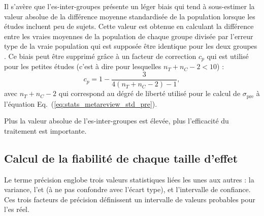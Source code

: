 Il s'avère que l'\gls{es}-inter-groupes présente un léger biais qui tend à sous-estimer la valeur absolue de la différence moyenne standardisée de la population
lorsque les études incluent peu de sujets. Cette valeur est obtenue en calculant la différence entre les vraies moyennes de la population de chaque groupe divisée 
par l'erreur type de la vraie population qui est supposée être identique pour les deux groupes \citep[Chapitre~4]{Borenstein2009}. Ce biais peut être supprimé 
grâce à un facteur de correction $c_p$ qui est utilisé pour les petites études (c'est à dire pour lesquelles $n_T + n_C - 2 < 10$) : 
\begin{equation}
\label{eq:metareview_correction_factor}
c_p =  1 - \frac{3} {4(n_T + n_C - 2) - 1},
\end{equation} 
avec $n_T + n_C - 2$ qui correspond au dégré de liberté utilisé pour le calcul de $\sigma_{\text{pre}}$ à l'équation Eq.~(\ref{eq:stats_metareview_std_pre}).

Plus la valeur absolue de l'\gls{es}-inter-groupes est élevée, plus l'efficacité du traitement est importante.

\subsection{Calcul de la fiabilité de chaque taille d'effet}

Le terme précision englobe trois valeurs statistiques liées les unes aux autres : la variance, l'\gls{et} (à ne pas confondre avec
l'écart type), et l'intervalle de confiance.
Ces trois facteurs de précision définissent un intervalle de valeurs probables pour l'\gls{es} réel. 

